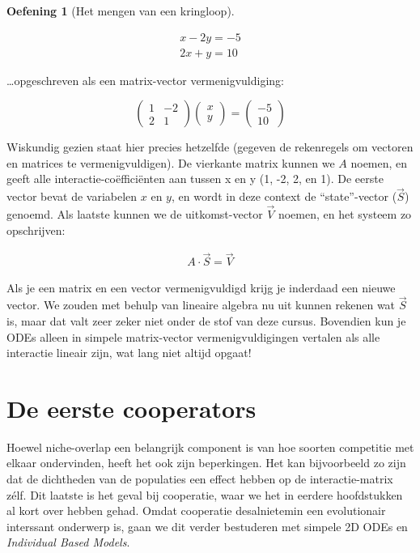 \documentclass[
  a4paper,
]{scrbook}
\theoremstyle{definition}
\newtheorem{exercise}{Oefening}[chapter]
\theoremstyle{remark}
\begin{document}
\begin{exercise}[Het mengen van een
kringloop]
\begin{tcolorbox}
\begin{align}
x - 2y = −5 \\
2x + y = 10 
\end{align}

\ldots opgeschreven als een matrix-vector vermenigvuldiging:

\begin{equation}
\begin{pmatrix}
1 & -2\\
2 & 1
\end{pmatrix}
\begin{pmatrix}
x \\
y 
\end{pmatrix}
=
\begin{pmatrix}
-5 \\
10 
\end{pmatrix}
\end{equation}

Wiskundig gezien staat hier precies hetzelfde (gegeven de rekenregels om
vectoren en matrices te vermenigvuldigen). De vierkante matrix kunnen we
\(A\) noemen, en geeft alle interactie-coëfficiënten aan tussen x en y
(1, -2, 2, en 1). De eerste vector bevat de variabelen \(x\) en \(y\),
en wordt in deze context de ``state''-vector (\(\overrightarrow{S}\))
genoemd. Als laatste kunnen we de uitkomst-vector \(\overrightarrow{V}\)
noemen, en het systeem zo opschrijven:

\begin{align}
A \cdot \overrightarrow{S} = \overrightarrow{V}
\end{align}

Als je een matrix en een vector vermenigvuldigd krijg je inderdaad een
nieuwe vector. We zouden met behulp van lineaire algebra nu uit kunnen
rekenen wat \(\overrightarrow{S}\) is, maar dat valt zeer zeker niet
onder de stof van deze cursus. Bovendien kun je ODEs alleen in simpele
matrix-vector vermenigvuldigingen vertalen als alle interactie lineair
zijn, wat lang niet altijd opgaat!

\end{tcolorbox}

\section{De eerste cooperators}\label{de-eerste-cooperators}

Hoewel niche-overlap een belangrijk component is van hoe soorten
competitie met elkaar ondervinden, heeft het ook zijn beperkingen. Het
kan bijvoorbeeld zo zijn dat de dichtheden van de populaties een effect
hebben op de interactie-matrix zélf. Dit laatste is het geval bij
cooperatie, waar we het in eerdere hoofdstukken al kort over hebben
gehad. Omdat cooperatie desalnietemin een evolutionair interssant
onderwerp is, gaan we dit verder bestuderen met simpele 2D ODEs en
\emph{Individual Based Models}.


\end{exercise}
\end{document}
